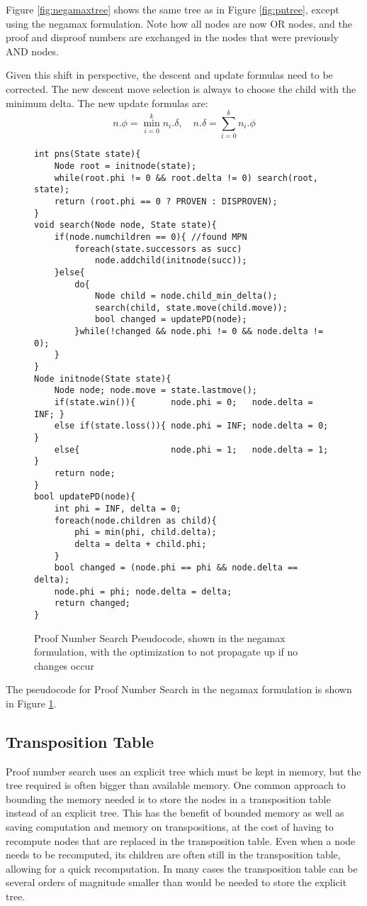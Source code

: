 Figure \ref{fig:negamaxtree} shows the same tree as in Figure \ref{fig:pntree}, except using the negamax formulation. Note how all nodes are now OR nodes, and the proof and disproof numbers are exchanged in the nodes that were previously AND nodes.

Given this shift in perspective, the descent and update formulas need to be corrected. The new descent move selection is always to choose the child with the minimum delta. The new update formulas are: $$ n.\phi = \displaystyle\min\limits_{i=0}^k n_i.\delta, \quad n.\delta = \displaystyle\sum\limits_{i=0}^k n_i.\phi $$

\begin{figure}

\begin{lstlisting}
int pns(State state){
	Node root = initnode(state);
	while(root.phi != 0 && root.delta != 0) search(root, state);
	return (root.phi == 0 ? PROVEN : DISPROVEN);
}
void search(Node node, State state){
	if(node.numchildren == 0){ //found MPN
		foreach(state.successors as succ)
			node.addchild(initnode(succ));
	}else{
		do{
			Node child = node.child_min_delta();
			search(child, state.move(child.move));
			bool changed = updatePD(node);
		}while(!changed && node.phi != 0 && node.delta != 0);
	}
}
Node initnode(State state){
	Node node; node.move = state.lastmove();
	if(state.win()){       node.phi = 0;   node.delta = INF; }
	else if(state.loss()){ node.phi = INF; node.delta = 0;   }
	else{                  node.phi = 1;   node.delta = 1;   }
	return node;
}
bool updatePD(node){
	int phi = INF, delta = 0;
	foreach(node.children as child){
		phi = min(phi, child.delta);
		delta = delta + child.phi;
	}
	bool changed = (node.phi == phi && node.delta == delta);
	node.phi = phi; node.delta = delta;
	return changed;
}
\end{lstlisting}

\caption{Proof Number Search Pseudocode, shown in the negamax formulation, with the optimization to not propagate up if no changes occur}
\label{fig:pnscode}
\end{figure}

The pseudocode for Proof Number Search in the negamax formulation is shown in Figure \ref{fig:pnscode}.


\subsection{Transposition Table}

Proof number search uses an explicit tree which must be kept in memory, but the tree required is often bigger than available memory. One common approach to bounding the memory needed is to store the nodes in a transposition table instead of an explicit tree. This has the benefit of bounded memory as well as saving computation and memory on transpositions, at the cost of having to recompute nodes that are replaced in the transposition table. Even when a node needs to be recomputed, its children are often still in the transposition table, allowing for a quick recomputation. In many cases the transposition table can be several orders of magnitude smaller than would be needed to store the explicit tree.


